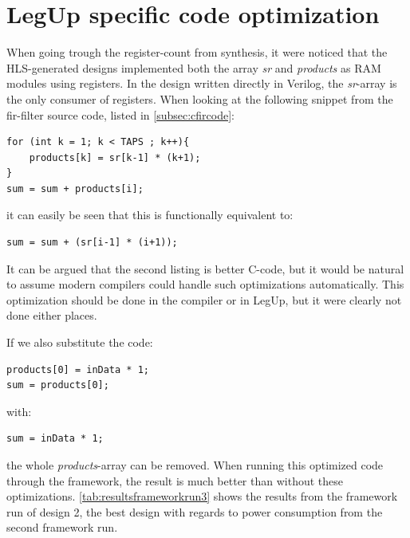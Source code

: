 \section{\label{sec:codeoptimization}LegUp specific code optimization}

When going trough the register-count from synthesis, it were noticed that the HLS-generated designs implemented both the array \textit{sr} and \textit{products} as RAM modules using registers. In the design written directly in Verilog, the \textit{sr}-array is the only consumer of registers. When looking at the following snippet from the \gls{fir}-filter source code, listed in \cref{subsec:cfircode}:
\lstset{language=C,style=CStyle}
\begin{lstlisting}
for (int k = 1; k < TAPS ; k++){
    products[k] = sr[k-1] * (k+1);
}
sum = sum + products[i];
\end{lstlisting}
it can easily be seen that this is functionally equivalent to:
\begin{lstlisting}
sum = sum + (sr[i-1] * (i+1));
\end{lstlisting}
It can be argued that the second listing is better C-code, but it would be natural to assume modern compilers could handle such optimizations automatically. This optimization should be done in the compiler or in LegUp, but it were clearly not done either places.

If we also substitute the code:
\begin{lstlisting}
products[0] = inData * 1;
sum = products[0];
\end{lstlisting}
with:
\begin{lstlisting}
sum = inData * 1;
\end{lstlisting}
the whole \textit{products}-array can be removed. When running this optimized code through the framework, the result is much better than without these optimizations. \cref{tab:resultsframeworkrun3} shows the results from the framework run of design 2, the best design with regards to power consumption from the second framework run.

